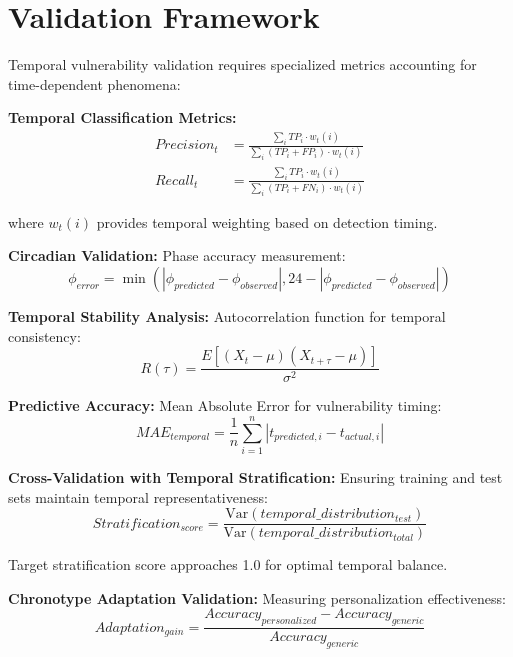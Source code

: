 \documentclass[11pt,a4paper]{article}
\begin{document}
\section{Validation Framework}

Temporal vulnerability validation requires specialized metrics accounting for time-dependent phenomena:

\textbf{Temporal Classification Metrics:}
\begin{align}
Precision_t &= \frac{\sum_i TP_i \cdot w_t(i)}{\sum_i (TP_i + FP_i) \cdot w_t(i)} \\
Recall_t &= \frac{\sum_i TP_i \cdot w_t(i)}{\sum_i (TP_i + FN_i) \cdot w_t(i)}
\end{align}

where $w_t(i)$ provides temporal weighting based on detection timing.

\textbf{Circadian Validation:}
Phase accuracy measurement:
\begin{equation}
\phi_{error} = \min(|\phi_{predicted} - \phi_{observed}|, 24 - |\phi_{predicted} - \phi_{observed}|)
\end{equation}

\textbf{Temporal Stability Analysis:}
Autocorrelation function for temporal consistency:
\begin{equation}
R(\tau) = \frac{E[(X_t - \mu)(X_{t+\tau} - \mu)]}{\sigma^2}
\end{equation}

\textbf{Predictive Accuracy:}
Mean Absolute Error for vulnerability timing:
\begin{equation}
MAE_{temporal} = \frac{1}{n} \sum_{i=1}^{n} |t_{predicted,i} - t_{actual,i}|
\end{equation}

\textbf{Cross-Validation with Temporal Stratification:}
Ensuring training and test sets maintain temporal representativeness:
\begin{equation}
Stratification_{score} = \frac{\text{Var}(temporal\_distribution_{test})}{\text{Var}(temporal\_distribution_{total})}
\end{equation}

Target stratification score approaches 1.0 for optimal temporal balance.

\textbf{Chronotype Adaptation Validation:}
Measuring personalization effectiveness:
\begin{equation}
Adaptation_{gain} = \frac{Accuracy_{personalized} - Accuracy_{generic}}{Accuracy_{generic}}
\end{equation}
\end{document}
